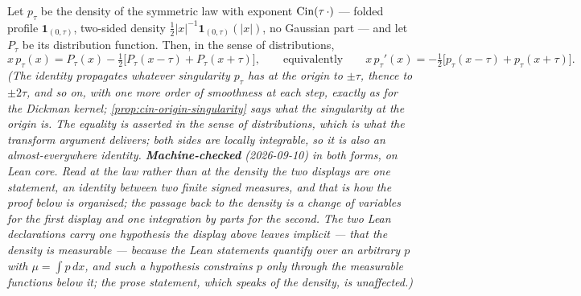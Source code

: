 \begin{lemma}\label{lem:cin-delay-equation}
\leanok
{}
Let $p_\tau$ be the density of the symmetric law with exponent $\operatorname{Cin}(\tau\,\cdot)$ --- folded
profile $\mathbf 1_{(0,\tau)}$, two-sided \Levy{} density
$\tfrac12|x|^{-1}\mathbf 1_{(0,\tau)}(|x|)$, no Gaussian part --- and let $P_\tau$ be its
distribution function. Then, in the sense of distributions,
\[
  x\,p_\tau(x) = P_\tau(x) - \tfrac12\bigl[P_\tau(x-\tau) + P_\tau(x+\tau)\bigr],
  \qquad\text{equivalently}\qquad
  x\,p_\tau'(x) = -\tfrac12\bigl[p_\tau(x-\tau) + p_\tau(x+\tau)\bigr].
\]
\statusT\quad\emph{(The identity propagates whatever singularity $p_\tau$ has at the origin to
$\pm\tau$, thence to $\pm2\tau$, and so on, with one more order of smoothness at each step,
exactly as for the Dickman kernel; \ref{prop:cin-origin-singularity} says what the singularity
at the origin is. The equality is asserted in the sense of distributions, which is what the
transform argument delivers; both sides are locally integrable, so it is also an
almost-everywhere identity. \textbf{Machine-checked} (2026-09-10) in both forms, on Lean core.
Read at the law rather than at the density the two displays are one statement, an identity
between two finite signed measures, and that is how the proof below is organised; the passage
back to the density is a change of variables for the first display and one integration by parts
for the second. The two Lean declarations carry one hypothesis the display above leaves
implicit --- that the density is measurable --- because the Lean statements quantify over an
arbitrary $p$ with $\mu = \int p\,dx$, and such a hypothesis constrains $p$ only through the
measurable functions below it; the prose statement, which speaks of \emph{the} density, is
unaffected.)}
\end{lemma}

